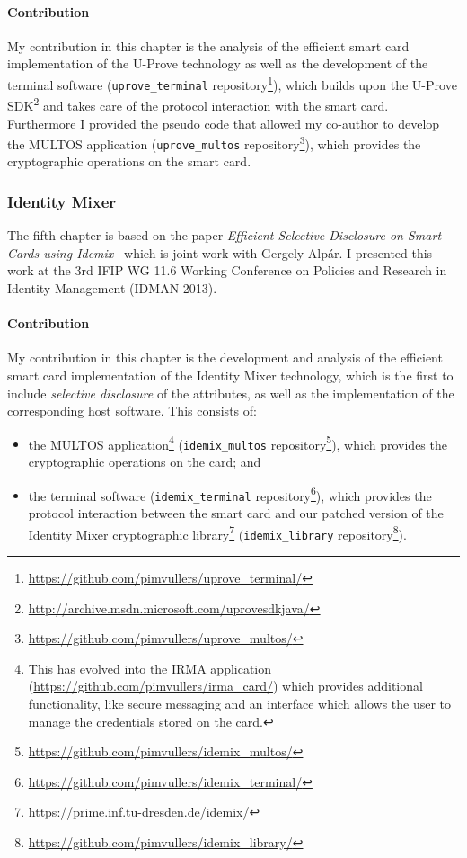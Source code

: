 \paragraph{Contribution}

My contribution in this chapter is the analysis of the efficient smart card
implementation of the U-Prove technology as well as the development of the
terminal software (\texttt{uprove\_terminal} repository\footnote{%
\url{https://github.com/pimvullers/uprove_terminal/}}), which builds upon the
U-Prove SDK\footnote{\url{http://archive.msdn.microsoft.com/uprovesdkjava/}}
and takes care of the protocol interaction with the smart card. Furthermore I
provided the pseudo code that allowed my co-author to develop the MULTOS
application (\texttt{uprove\_multos} repository\footnote{%
\url{https://github.com/pimvullers/uprove_multos/}}), which provides the
cryptographic operations on the smart card.

\subsubsection{Identity Mixer}

The fifth chapter is based on the paper \emph{Efficient Selective Disclosure on
Smart Cards using Idemix}~\cite{VullersAlpar2013} which is joint work with
Gergely Alp\'ar. I presented this work at the 3rd IFIP WG 11.6 Working
Conference on Policies and Research in Identity Management (IDMAN 2013).

\paragraph{Contribution}

My contribution in this chapter is the development and analysis of the efficient
smart card implementation of the Identity Mixer technology, which is the first
to include \emph{selective disclosure} of the attributes, as well as the
implementation of the corresponding host software. This consists of:
\begin{itemize}
  \item the MULTOS application\footnote{This has evolved into the IRMA
    application (\url{https://github.com/pimvullers/irma_card/}) which provides
    additional functionality, like secure messaging and an interface which
    allows the user to manage the credentials stored on the card.}
    (\texttt{idemix\_multos} repository\footnote{%
    \url{https://github.com/pimvullers/idemix_multos/}}), which provides the
    cryptographic operations on the card; and
  \item the terminal software (\texttt{idemix\_terminal} repository\footnote{%
    \url{https://github.com/pimvullers/idemix_terminal/}}), which provides the
    protocol interaction between the smart card and our patched version of the
    Identity Mixer cryptographic
    library\footnote{\url{https://prime.inf.tu-dresden.de/idemix/}}
    (\texttt{idemix\_library} repository\footnote{%
    \url{https://github.com/pimvullers/idemix_library/}}).
\end{itemize}

